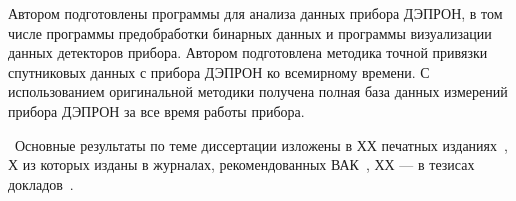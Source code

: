 Автором подготовлены программы для анализа данных прибора ДЭПРОН, в том числе программы предобработки бинарных данных и программы визуализации данных детекторов прибора. 
Автором подготовлена методика точной привязки спутниковых данных с прибора ДЭПРОН ко всемирному времени. С использованием оригинальной методики получена полная база данных измерений прибора ДЭПРОН за все время работы прибора.

\publications\ Основные результаты по теме диссертации изложены в ХХ печатных изданиях~\cite{zolotarev2017numerical51590279,vlasova2017optimization27547274,vlasova2015operational11246447},
Х из которых изданы в журналах, рекомендованных ВАК~\cite{zolotarev2016chislennoe32150868}, 
ХХ --- в тезисах докладов~\cite{zolotarev2016modelirovanie36997161,grafodatsky2016development21020642, amelyushkin2015sozdanie10657329, angelopoulos2010university5851829, angelopoulos2011university1295357}.
